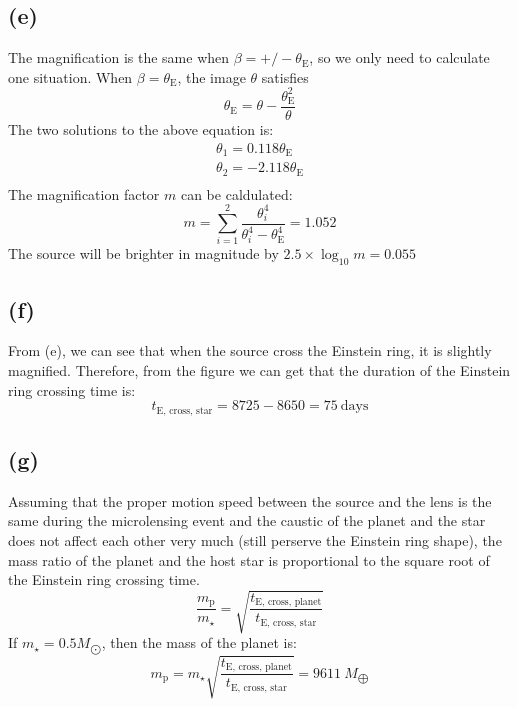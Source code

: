 \documentclass[a4paper,12pt]{article}
\begin{document}
\subsection*{(e)}
The magnification is the same when $\beta = +/-\theta_{\text{E}}$, so we only need to 
calculate one situation. When $\beta = \theta_{\text{E}}$, the image $\theta$ satisfies
\begin{equation}
    \theta_\text{E} = \theta - \frac{\theta_{\text{E}}^2}{\theta}
\end{equation}
The two solutions to the above equation is:
\begin{align*}
    \theta_1 = 0.118 \theta_{\text{E}} \\
    \theta_2 = -2.118 \theta_{\text{E}} \\
\end{align*}
The magnification factor $m$ can be caldulated:
\begin{equation}
    m = \sum_{i = 1}^{2} \frac{\theta_i^4}{\theta_i^4 - \theta_{\text{E}}^4} = 1.052
\end{equation}
The source will be brighter in magnitude by $2.5\times \log_{10} m = 0.055$

\subsection*{(f)}
From (e), we can see that when the source cross the 
Einstein ring, it is slightly magnified. Therefore, 
from the figure we can get that the duration of the Einstein 
ring crossing time is:
\begin{equation}
    t_{\text{E, cross, star}} = 8725 - 8650 = 75 \ \text{days}
\end{equation}

\subsection*{(g)}
Assuming that the proper motion speed between the source 
and the lens is the same during the microlensing event
and the caustic of the planet and the star does not affect each other
 very much (still perserve the Einstein ring shape), 
the mass ratio of the planet and the host star 
is proportional to the square root of the Einstein ring 
crossing time.
\begin{equation}
    \frac{m_{\text{p}}}{m_{\star}} = \sqrt{\frac{t_{\text{E, cross, planet}}}{t_{\text{E, cross, star}}}}
\end{equation}
If $m_{\star} = 0.5 M_{\bigodot}$, then the mass of the planet is:
\begin{equation}
    m_{\text{p}} = m_\star \sqrt{\frac{t_{\text{E, cross, planet}}}{t_{\text{E, cross, star}}}} = 9611 \ M_{\bigoplus}
\end{equation}
\end{document}
